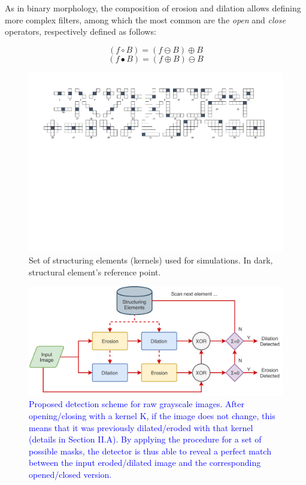 \documentclass{ieeeaccess}
\newcommand{\revisedtext}[1]{\textcolor{blue}{#1}}
\begin{document}
As in binary morphology, the composition of erosion and dilation allows defining more complex filters, among which the most common are the \textit{open} and \textit{close} operators, respectively defined as follows:

\begin{equation}
(f \circ B) = (f \ominus B) \oplus B
\end{equation}
\vspace{-0.5cm}
\begin{equation}
(f \bullet B) = (f \oplus B) \ominus B
\end{equation}

\begin{figure}[th!]
	\centering
	\includegraphics[width=\linewidth]{kernels}
	\caption{Set of structuring elements (kernels) used for simulations. In dark, structural element's reference point.}
	\label{fig:masks}
\end{figure}

\begin{figure}[th!]
	\centering
	\includegraphics[width=0.7\linewidth]{diagram1}
	\caption{\revisedtext{Proposed detection scheme for raw grayscale images. After opening/closing with a kernel K, if the image does not change, this means that it was previously dilated/eroded with that kernel (details in Section II.A). By applying the procedure for a set of possible masks, the detector is thus able to reveal a perfect match between the input eroded/dilated image and the corresponding opened/closed version.}}
	\label{fig:scheme}
\end{figure}
\end{document}
